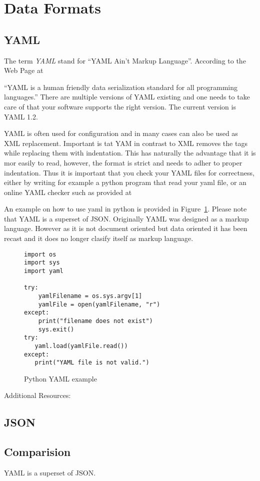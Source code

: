 \section{Data Formats}

\subsection{YAML}

The term \emph{YAML} stand for ``YAML Ain't Markup
Language''. According to the Web Page at 


``YAML is a human friendly data serialization standard for all
programming languages.'' There are multiple versions of YAML existing
and one needs to take care of that your software supports the right
version. The current version is YAML 1.2.

YAML is often used for configuration and in many cases can also be
used as XML replacement. Important is tat YAM in contrast to XML
removes the tags while replacing them with indentation. This has
naturally the advantage that it is mor easily to read, however, the
format is strict and needs to adher to proper indentation. Thus it is
important that you check your YAML files for correctness, either by
writing for example a python program that read your yaml file, or an
online YAML checker such as provided at 


An example on how to use yaml in python is provided in
Figure~\ref{F:yaml}. Please note that YAML is a superset of
JSON. Originally YAML was designed as a markup language. However as it
is not document oriented but data oriented it has been recast and it
does no longer clasify itself as markup language. 

\begin{figure}[htb]
\begin{lstlisting}
import os
import sys
import yaml

try:
    yamlFilename = os.sys.argv[1]
    yamlFile = open(yamlFilename, "r")
except:
    print("filename does not exist")
    sys.exit()
try:
   yaml.load(yamlFile.read())
except:
   print("YAML file is not valid.")
\end{lstlisting}
\caption{Python YAML example}\label{F:yaml}
\end{figure}

Additional Resources: 




\subsection{JSON}



\subsection{Comparision}


YAML is a superset of JSON. 

